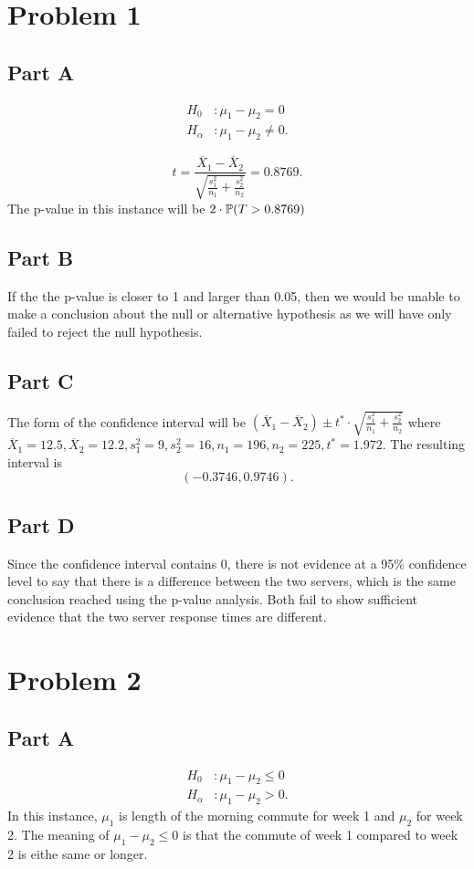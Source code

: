 \documentclass[12pt]{extarticle}
\begin{document}
\section*{Problem 1}
\subsection*{Part A}
\begin{align*}
	H_0 &: \mu_1 - \mu_2 = 0 \\
	H_\alpha &: \mu_1 - \mu_2 \neq 0
.\end{align*}

\[
	t = \frac{\overline{X}_1 - \overline{X}_2}{\sqrt{
			\frac{s_1^2}{n_1} + \frac{s_2^2}{n_2}
	}} = 0.8769
.\]
The p-value in this instance will be $2\cdot\mathbb{P}\qty(T > 0.8769)$

\subsection*{Part B}
If the the p-value is closer to 1 and larger than 0.05, then we would be unable to make a conclusion about the null or alternative hypothesis as we will have only failed to reject the null hypothesis.

\subsection*{Part C}
The form of the confidence interval will be $(\overline{X}_1 - \overline{X}_2) \pm t^* \cdot \sqrt{\frac{s_1^2}{n_1} + \frac{s_2^2}{n_2}}$ where $\overline{X}_1 = 12.5, \overline{X}_2 = 12.2, s_1^2 = 9, s_2^2 = 16, n_1 = 196, n_2 = 225, t^* = 1.972$. The resulting interval is
\[
	(-0.3746, 0.9746)
.\]

\subsection*{Part D}
Since the confidence interval contains 0, there is not evidence at a 95\% confidence level to say that there is a difference between the two servers, which is the same conclusion reached using the p-value analysis. Both fail to show sufficient evidence that the two server response times are different.

\section*{Problem 2}
\subsection*{Part A}
\begin{align*}
	H_0 &: \mu_1 - \mu_2 \leq 0 \\
	H_\alpha &: \mu_1 - \mu_2 > 0
.\end{align*}
In this instance, $\mu_1$ is length of the morning commute for week 1 and $\mu_2$ for week 2. The meaning of $\mu_1 - \mu_2 \leq 0$ is that the commute of week 1 compared to week 2 is eithe same or longer.
\end{document}
